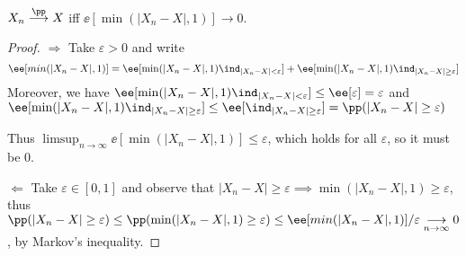 \documentclass[../main.tex]{subfiles}
\begin{document}
   \begin{proposition}
     $X_n \overset{\pp}{\longrightarrow} X$ iff $\ee[\min(|X_n - X|, 1)]
     \to 0$. 
   \end{proposition}
   \begin{proof}
     $\boxed{\Rightarrow}$ Take $\varepsilon>0$ and write $$\ee[min(|X_n - X|,
     1)] = \ee[\min(|X_n - X|, 1) \ind_{|X_n - X| < \varepsilon}] + 
     \ee[\min(|X_n - X|, 1) \ind_{|X_n - X| \geq \varepsilon}]$$
     Moreover, we have $\ee[\min(|X_n - X|, 1) \ind_{|X_n - X| < \varepsilon}]
     \leq \ee[\varepsilon] = \varepsilon$ and $\ee[\min(|X_n - X|, 1)
     \ind_{|X_n - X| \geq \varepsilon}] \leq \ee[\ind_{|X_n - X| \geq
     \varepsilon}] = \pp(|X_n - X| \geq \varepsilon)$ 
     \vspace{0.3em}

     \noindent
     Thus $\limsup_{n \to \infty} \ee[\min(|X_n - X|, 1)] \leq
     \varepsilon$, which holds for all $\varepsilon$, so it must be $0$.

     \vspace{1em}
     \noindent
     $\boxed{\Leftarrow}$ Take $\varepsilon \in [0, 1]$ and observe that $|X_n
     - X| \geq \varepsilon \implies \min(|X_n - X|, 1) \geq \varepsilon$, thus
     $\pp(|X_n - X| \geq \varepsilon) \leq \pp(\min(|X_n - X|, 1) \geq
     \varepsilon) \leq \ee[min(|X_n - X|, 1)] / \varepsilon \underset{n \to
     \infty}{\longrightarrow} 0$, by Markov's inequality.
   \end{proof}
\end{document}
